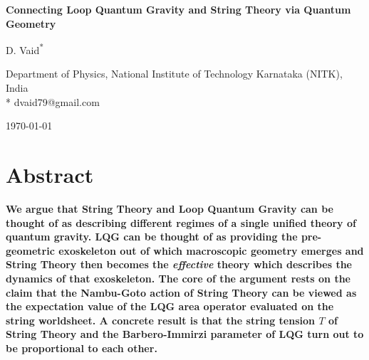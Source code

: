 \documentclass[submission, Phys]{SciPost}
\begin{document}
\begin{center}{\Large \textbf{
Connecting Loop Quantum Gravity and String Theory via Quantum Geometry
}}\end{center}

\begin{center}
D. Vaid\textsuperscript{*}
\end{center}

\begin{center}
Department of Physics, National Institute of Technology Karnataka (NITK), India \\
* dvaid79@gmail.com
\end{center}

\begin{center}
\today
\end{center}


\section*{Abstract}
{\bf
We argue that String Theory and Loop Quantum Gravity can be thought of as describing different regimes of a single unified theory of quantum gravity. LQG can be thought of as providing the pre-geometric exoskeleton out of which macroscopic geometry emerges and String Theory then becomes the \emph{effective} theory which describes the dynamics of that exoskeleton. The core of the argument rests on the claim that the Nambu-Goto action of String Theory can be viewed as the expectation value of the LQG area operator evaluated on the string worldsheet. A concrete result is that the string tension $ T $ of String Theory and the Barbero-Immirzi parameter of LQG turn out to be proportional to each other.
}
\end{document}
